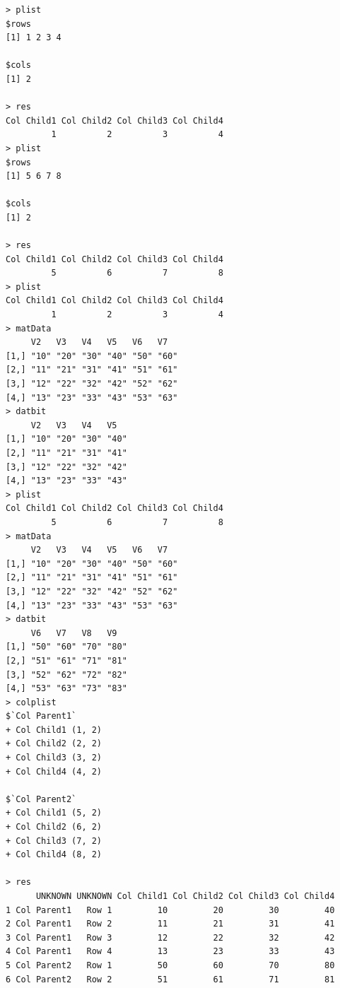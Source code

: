 \documentclass[a4paper]{article}
\begin{document}
\begin{verbatim}
> plist 
$rows
[1] 1 2 3 4

$cols
[1] 2

> res 
Col Child1 Col Child2 Col Child3 Col Child4 
         1          2          3          4 
> plist 
$rows
[1] 5 6 7 8

$cols
[1] 2

> res 
Col Child1 Col Child2 Col Child3 Col Child4 
         5          6          7          8 
> plist 
Col Child1 Col Child2 Col Child3 Col Child4 
         1          2          3          4 
> matData 
     V2   V3   V4   V5   V6   V7  
[1,] "10" "20" "30" "40" "50" "60"
[2,] "11" "21" "31" "41" "51" "61"
[3,] "12" "22" "32" "42" "52" "62"
[4,] "13" "23" "33" "43" "53" "63"
> datbit 
     V2   V3   V4   V5  
[1,] "10" "20" "30" "40"
[2,] "11" "21" "31" "41"
[3,] "12" "22" "32" "42"
[4,] "13" "23" "33" "43"
> plist 
Col Child1 Col Child2 Col Child3 Col Child4 
         5          6          7          8 
> matData 
     V2   V3   V4   V5   V6   V7  
[1,] "10" "20" "30" "40" "50" "60"
[2,] "11" "21" "31" "41" "51" "61"
[3,] "12" "22" "32" "42" "52" "62"
[4,] "13" "23" "33" "43" "53" "63"
> datbit 
     V6   V7   V8   V9  
[1,] "50" "60" "70" "80"
[2,] "51" "61" "71" "81"
[3,] "52" "62" "72" "82"
[4,] "53" "63" "73" "83"
> colplist 
$`Col Parent1`
+ Col Child1 (1, 2)
+ Col Child2 (2, 2)
+ Col Child3 (3, 2)
+ Col Child4 (4, 2)

$`Col Parent2`
+ Col Child1 (5, 2)
+ Col Child2 (6, 2)
+ Col Child3 (7, 2)
+ Col Child4 (8, 2)

> res 
      UNKNOWN UNKNOWN Col Child1 Col Child2 Col Child3 Col Child4
1 Col Parent1   Row 1         10         20         30         40
2 Col Parent1   Row 2         11         21         31         41
3 Col Parent1   Row 3         12         22         32         42
4 Col Parent1   Row 4         13         23         33         43
5 Col Parent2   Row 1         50         60         70         80
6 Col Parent2   Row 2         51         61         71         81
\end{verbatim}

\newpage
\end{document}
